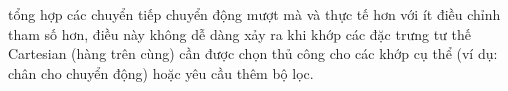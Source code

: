 tổng hợp các chuyển tiếp chuyển động mượt mà và thực tế hơn với ít điều chỉnh tham số hơn, điều này không dễ dàng xảy ra khi khớp các đặc trưng tư thế Cartesian (hàng trên cùng) cần được chọn thủ công cho các khớp cụ thể (ví dụ: chân cho chuyển động) hoặc yêu cầu thêm bộ lọc.





%
%
%
%
%
%
%
%
%
